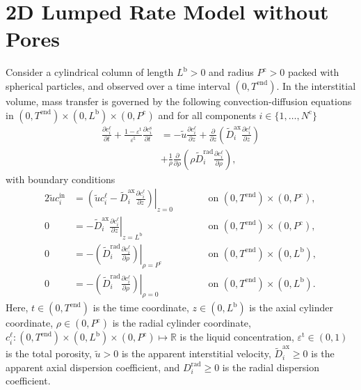 \documentclass{article}
\begin{document}
\section*{2D Lumped Rate Model without Pores}
Consider a cylindrical column of length $L^{\mathrm{b}} > 0$ and radius $P^{\mathrm{c}} > 0$ packed with spherical particles, and observed over a time interval $(0, T^{\mathrm{end}})$.
In the interstitial volume, mass transfer is governed by the following convection-diffusion equations in $(0, T^{\mathrm{end}})\times (0, L^{\mathrm{b}})\times (0, P^{\mathrm{c}})$ and for all components $i\in\{1, \dots, N^{\mathrm{c}} \}$
\begin{align}
    \frac{\partial c^{\mathrm{\ell}}_{i}}{\partial t}
        + \frac{1 - \varepsilon^{\mathrm{t}}}{\varepsilon^{\mathrm{t}}} \frac{\partial c^{\mathrm{s}}_{i}}{\partial t}
    &= - \tilde{u} \frac{\partial c^{\mathrm{\ell}}_{i} }{\partial z}
        + \frac{\partial}{\partial z} \left( \tilde{D}^{\mathrm{ax}}_{i} \frac{\partial c^{\mathrm{\ell}}_{i}}{\partial z} \right) \nonumber
    \\
    &+ \frac{1}{\rho} \frac{\partial}{\partial \rho} \left( \rho \tilde{D}^{\mathrm{rad}}_{i} \frac{\partial c^{\mathrm{\ell}}_{i}}{\partial \rho} \right),
\end{align}
with boundary conditions
\begin{alignat}{2}
    \tilde{u} c^{\mathrm{in}}_{i}
    &= \left.\left( \tilde{u} c^{\mathrm{\ell}}_{i} - \tilde{D}^{\mathrm{ax}}_{i} \frac{\partial c^{\mathrm{\ell}}_{i}}{\partial z}\right)\right|_{z=0}
    & & \qquad\text{on }(0, T^{\mathrm{end}})\times (0, P^{\mathrm{c}}),
    \\
    0
    &= - \tilde{D}^{\mathrm{ax}}_{i} \left. \frac{\partial c^{\mathrm{\ell}}_{i}}{\partial z} \right|_{z=L^{\mathrm{b}}}
    & & \qquad\text{on }(0, T^{\mathrm{end}})\times (0, P^{\mathrm{c}}),
    \\
    0
    &= - \left(\tilde{D}^{\mathrm{rad}}_{i} \left. \frac{\partial c^{\mathrm{\ell}}_{i}}{\partial \rho} \right) \right|_{\rho=P^{\mathrm{c}}}
    & & \qquad\text{on }(0, T^{\mathrm{end}}) \times (0, L^{\mathrm{b}}),
    \\
    0
    &= - \left(\tilde{D}^{\mathrm{rad}}_{i} \left. \frac{\partial c^{\mathrm{\ell}}_{i}}{\partial \rho} \right) \right|_{\rho=0}
    & & \qquad\text{on }(0, T^{\mathrm{end}}) \times (0, L^{\mathrm{b}}).
\end{alignat}
Here, $t\in (0, T^{\mathrm{end}})$ is the time coordinate, $z\in (0, L^{\mathrm{b}})$ is the axial cylinder coordinate, $\rho\in (0, P^{\mathrm{c}})$ is the radial cylinder coordinate, $c^{\mathrm{\ell}}_{i}\colon (0, T^{\mathrm{end}})\times (0, L^{\mathrm{b}})\times (0, P^{\mathrm{c}}) \mapsto \mathbb{R}$ is the liquid concentration, $\varepsilon^{\mathrm{t}}\in (0, 1)$ is the total porosity, $\tilde{u}> 0$ is the apparent interstitial velocity, $\tilde{D}^{\mathrm{ax}}_{i}\geq 0$ is the apparent axial dispersion coefficient, and $D^{\mathrm{rad}}_{i}\geq 0$ is the radial dispersion coefficient.
\end{document}

